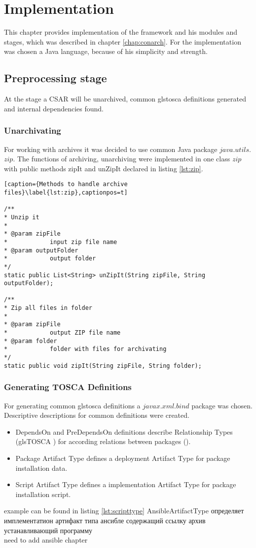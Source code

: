 
\chapter{Implementation}\label{chap:imp}
This chapter provides implementation of the framework and his modules and stages, which was described in chapter \ref{chap:conarch}.
For the implementation was chosen a Java language, because of his simplicity and strength. 

\section{Preprocessing stage}
At the  stage a CSAR will be unarchived, common gls{tosca} definitions generated and internal dependencies found. 

\subsection*{Unarchivating}
For working with archives it was decided to use common Java package $java$.$utils$.$zip$.
The functions of archiving, unarchiving were implemented in one class $zip$ with public methods zipIt and unZipIt declared in listing \ref{lst:zip}.
\begin{lstlisting}[caption={Methods to handle archive files}\label{lst:zip},captionpos=t] 

/**
* Unzip it
* 
* @param zipFile
*            input zip file name
* @param outputFolder
*            output folder
*/
static public List<String> unZipIt(String zipFile, String outputFolder);

/**
* Zip all files in folder
* 
* @param zipFile
*            output ZIP file name
* @param folder
*            folder with files for archivating
*/
static public void zipIt(String zipFile, String folder);
\end{lstlisting}

\subsection*{Generating TOSCA Definitions}
For generating common gls{tosca} definitions a $javax$.$xml$.$bind$ package was chosen. 
Descriptive descriptions for common definitions were created.
\begin{itemize}
	\item DependsOn and PreDependsOn definitions describe Relationship Types (gls{TOSCA} ) for according relations between packages (). 
	\item Package Artifact Type defines a deployment Artifact Type for package installation data.
	\item Script Artifact Type defines a implementation Artifact Type for package installation script.
\end{itemize}
example can be found in listing \ref{lst:scripttype}
AnsibleArtifactType  определяет имплементатион артифакт типа ансибле содержащий ссылку архив устанавливающий программу 
\\need to add ansible chapter
\fi
